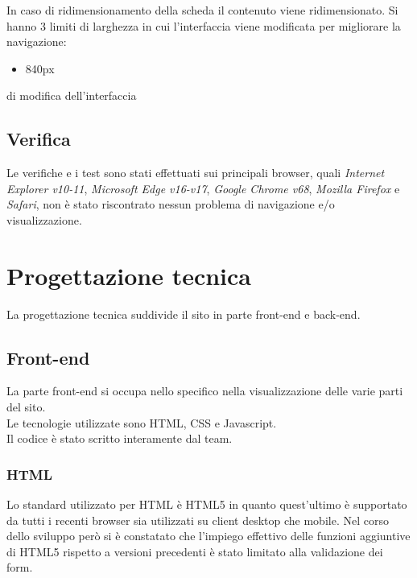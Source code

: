 In caso di ridimensionamento della scheda il contenuto viene ridimensionato.
Si hanno 3 limiti di larghezza in cui l'interfaccia viene modificata per migliorare la navigazione:
\begin{itemize}
	\item 840px
\end{itemize}di modifica dell'interfaccia

\subsection{Verifica}
Le verifiche e i test sono stati effettuati sui principali browser, quali \textit{Internet Explorer v10-11}, \textit{Microsoft Edge v16-v17},  \textit{Google Chrome v68},
\textit{Mozilla Firefox} e \textit{Safari}, non è stato riscontrato nessun problema di navigazione e/o visualizzazione.
\section{Progettazione tecnica}
La progettazione tecnica suddivide il sito in parte front-end e back-end.
\subsection{Front-end}

La parte front-end si occupa nello specifico nella visualizzazione delle varie parti del sito.\\
Le tecnologie utilizzate sono HTML, CSS e Javascript.\\
Il codice è stato scritto interamente dal team.

\subsubsection{HTML}

Lo standard utilizzato per HTML è HTML5 in quanto quest’ultimo è supportato da tutti i recenti browser sia utilizzati su client desktop che mobile. 
Nel corso dello sviluppo però si è constatato che l’impiego effettivo delle funzioni aggiuntive di HTML5 rispetto a versioni precedenti è stato limitato alla validazione dei form.

